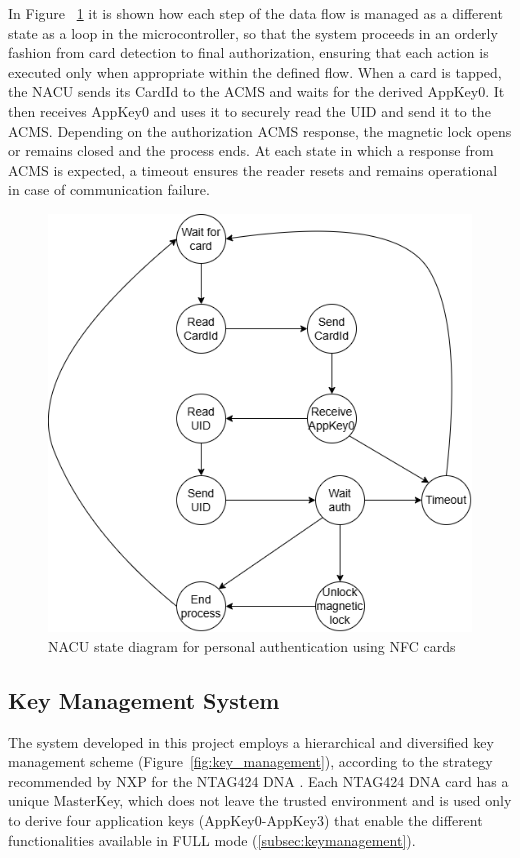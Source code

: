 In Figure ~\ref{fig:nacu_states}  it is shown how each step of the data flow is managed as a different state as a loop in the microcontroller, so that the system proceeds in an orderly
fashion from card detection to final authorization, ensuring that each action is
executed only when appropriate within the defined flow. When a card is tapped, the
NACU sends its CardId to the ACMS and waits for the derived AppKey0. It then
receives AppKey0 and uses it to securely read the UID and send it to the ACMS.
Depending on the authorization ACMS response, the magnetic lock opens or
remains closed and the process ends. At each state in which a response from ACMS
is expected, a timeout ensures the reader resets and remains operational in case of
communication failure.

\begin{figure}[H]
	\centering
	\includegraphics[width=\textwidth]{imaxes/stateD}
	\caption{ NACU state diagram for personal authentication using NFC cards}
	\label{fig:nacu_states}
\end{figure}

\subsection{Key Management System}

The system developed in this project employs a hierarchical and diversified key
management scheme (Figure~\ref{fig:key_management}), according to the strategy recommended by NXP
for the NTAG424 DNA \cite{ref42}. Each NTAG424 DNA card has a unique MasterKey,
which does not leave the trusted environment and is used only to derive four
application keys (AppKey0-AppKey3) that enable the different functionalities
available in FULL mode (\ref{subsec:keymanagement}).



